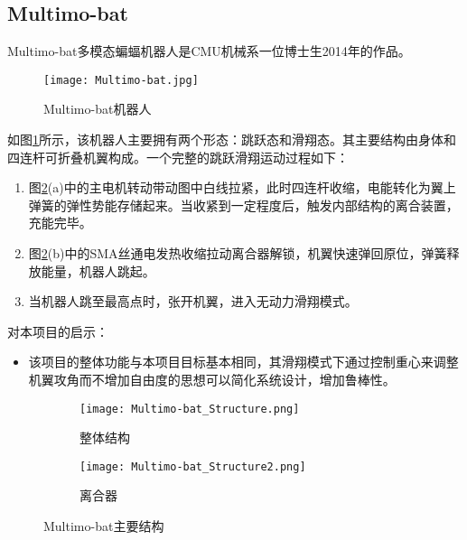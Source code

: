 \subsection{Multimo-bat}
Multimo-bat多模态蝙蝠机器人是CMU机械系一位博士生2014年的作品。  
\begin{figure}[H]
  \centering
  \texttt{[image: Multimo-bat.jpg]}
  \caption{Multimo-bat机器人\cite{multimo}}
  \label{fig:multimo}
\end{figure}
如图\ref{fig:multimo}所示，该机器人主要拥有两个形态：跳跃态和滑翔态。其主要结构由身体和四连杆可折叠机翼构成。一个完整的跳跃滑翔运动过程如下：
\begin{enumerate}
  \item 图\ref{fig:multimo_struct}(a)中的主电机转动带动图中白线拉紧，此时四连杆收缩，电能转化为翼上弹簧的弹性势能存储起来。当收紧到一定程度后，触发内部结构的离合装置，充能完毕。
  \item 图\ref{fig:multimo_struct}(b)中的SMA丝通电发热收缩拉动离合器解锁，机翼快速弹回原位，弹簧释放能量，机器人跳起。
  \item 当机器人跳至最高点时，张开机翼，进入无动力滑翔模式。
\end{enumerate}
对本项目的启示：
\begin{itemize}
  \item 该项目的整体功能与本项目目标基本相同，其滑翔模式下通过控制重心来调整机翼攻角而不增加自由度的思想可以简化系统设计，增加鲁棒性。
\end{itemize}
\begin{figure}[h]
  \centering%
  \begin{subfigure}{6cm}
    \texttt{[image: Multimo-bat\_Structure.png]}
    \caption{整体结构}
  \end{subfigure}%
  \hspace{3em}%
  \begin{subfigure}{0.5\textwidth}
    \texttt{[image: Multimo-bat\_Structure2.png]}
    \caption{离合器}
  \end{subfigure}
  \caption{Multimo-bat主要结构\cite{multimo}}
  \label{fig:multimo_struct}
\end{figure}

